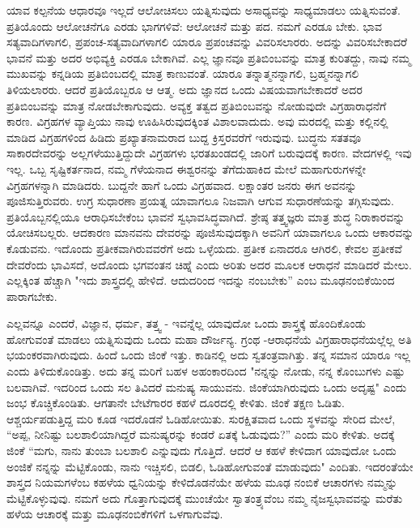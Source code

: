 ಯಾವ ಕಲ್ಪನೆಯ ಆಧಾರವೂ ಇಲ್ಲದೆ ಆಲೋಚಿಸಲು ಯತ್ನಿಸುವುದು ಅಸಾಧ್ಯವನ್ನು ಸಾಧ್ಯಮಾಡಲು ಯತ್ನಿಸುವಂತೆ. ಪ್ರತಿಯೊಂದು ಆಲೋಚನೆಗೂ ಎರಡು ಭಾಗಗಳಿವೆ: ಆಲೋಚನೆ ಮತ್ತು ಪದ. ನಮಗೆ ಎರಡೂ ಬೇಕು. ಭಾವ ಸತ್ಯವಾದಿಗಳಾಗಲಿ, ಪ್ರಪಂಚ-ಸತ್ಯವಾದಿಗಳಾಗಲಿ ಯಾರೂ ಪ್ರಪಂಚವನ್ನು ವಿವರಿಸಲಾರರು. ಅದನ್ನು ವಿವರಿಸಬೇಕಾದರೆ ಭಾವನೆ ಮತ್ತು ಅದರ ಅಭಿವ್ಯಕ್ತಿ ಎರಡೂ ಬೇಕಾಗಿವೆ. ಎಲ್ಲ ಜ್ಞಾನವೂ ಪ್ರತಿಬಿಂಬವನ್ನು ಮಾತ್ರ ಕುರಿತದ್ದು, ನಾವು ನಮ್ಮ ಮುಖವನ್ನು ಕನ್ನಡಿಯ ಪ್ರತಿಬಿಂಬದಲ್ಲಿ ಮಾತ್ರ ಕಾಣುವಂತೆ. ಯಾರೂ ತನ್ನಾತ್ಮನನ್ನಾಗಲಿ, ಬ್ರಹ್ಮನನ್ನಾಗಲಿ ತಿಳಿಯಲಾರರು. ಆದರೆ ಪ್ರತಿಯೊಬ್ಬರೂ ಆ ಆತ್ಮ. ಅದು ಜ್ಞಾನದ ಒಂದು ವಿಷಯವಾಗಬೇಕಾದರೆ ಅದರ ಪ್ರತಿಬಿಂಬವನ್ನು ಮಾತ್ರ ನೋಡಬೇಕಾಗುವುದು. ಅವ್ಯಕ್ತ ತತ್ವದ ಪ್ರತಿಬಿಂಬವನ್ನು ನೋಡುವುದೇ ವಿಗ್ರಹಾರಾಧನೆಗೆ ಕಾರಣ. ವಿಗ್ರಹಗಳ ವ್ಯಾಪ್ತಿಯು ನಾವು ಊಹಿಸಿರುವುದಕ್ಕಿಂತ ವಿಶಾಲವಾದುದು. ಅವು ಮರದಲ್ಲಿ ಮತ್ತು ಕಲ್ಲಿನಲ್ಲಿ ಮಾಡಿದ ವಿಗ್ರಹಗಳಿಂದ ಹಿಡಿದು ಪ್ರಖ್ಯಾತನಾಮರಾದ ಬುದ್ದ ಕ್ರಿಸ್ತರವರೆಗೆ ಇರುವುವು. ಬುದ್ಧನು ಸತತವೂ ಸಾಕಾರದೇವರನ್ನು ಅಲ್ಲಗಳೆಯುತ್ತಿದ್ದುದೇ ವಿಗ್ರಹಗಳು ಭರತಖಂಡದಲ್ಲಿ ಜಾರಿಗೆ ಬರುವುದಕ್ಕೆ ಕಾರಣ. ವೇದಗಳಲ್ಲಿ ಇವು ಇಲ್ಲ. ಒಬ್ಬ ಸೃಷ್ಟಿಕರ್ತನಾದ, ನಮ್ಮ ಗೆಳೆಯನಾದ ಈಶ್ವರನನ್ನು ತೆಗೆದುಹಾಕಿದ ಮೇಲೆ ಮಹಾಗುರುಗಳನ್ನೇ ವಿಗ್ರಹಗಳನ್ನಾಗಿ ಮಾಡಿದರು. ಬುದ್ದನೇ ಹಾಗೆ ಒಂದು ವಿಗ್ರಹವಾದ. ಲಕ್ಷಾಂತರ ಜನರು ಈಗ ಅವನನ್ನು ಪೂಜಿಸುತ್ತಿರುವರು. ಉಗ್ರ ಸುಧಾರಣಾ ಪ್ರಯತ್ನ ಯಾವಾಗಲೂ ನಿಜವಾಗಿ ಆಗುವ ಸುಧಾರಣೆಯನ್ನು ತಗ್ಗಿಸುವುದು. ಪ್ರತಿಯೊಬ್ಬನಲ್ಲಿಯೂ ಆರಾಧಿಸಬೇಕೆಂಬ ಭಾವನೆ ಸ್ವಭಾವಸಿದ್ಧವಾಗಿದೆ. ಶ್ರೇಷ್ಠ ತತ್ತ್ವಜ್ಞರು ಮಾತ್ರ ಶುದ್ಧ ನಿರಾಕಾರವನ್ನು ಯೋಚಿಸಬಲ್ಲರು. ಆದಕಾರಣ ಮಾನವನು ದೇವರನ್ನು ಪೂಜಿಸುವುದಕ್ಕಾಗಿ ಅವನಿಗೆ ಯಾವಾಗಲೂ ಒಂದು ಆಕಾರವನ್ನು ಕೊಡುವನು. ಇದೊಂದು ಪ್ರತೀಕವಾಗಿರುವವರೆಗೆ ಅದು ಒಳ್ಳೆಯದು. ಪ್ರತೀಕ ಏನಾದರೂ ಆಗಿರಲಿ, ಕೇವಲ ಪ್ರತೀಕವೆ ದೇವರೆಂದು ಭಾವಿಸದೆ, ಅದೊಂದು ಭಗವಂತನ ಚಿಹ್ನೆ ಎಂದು ಅರಿತು ಅದರ ಮೂಲಕ ಆರಾಧನೆ ಮಾಡಿದರೆ ಮೇಲು. ಎಲ್ಲಕ್ಕಿಂತ ಹೆಚ್ಚಾಗಿ "ಇದು ಶಾಸ್ತ್ರದಲ್ಲಿ ಹೇಳಿದೆ. ಆದುದರಿಂದ ಇದನ್ನು ನಂಬಬೇಕು'' ಎಂಬ ಮೂಢನಂಬಿಕೆಯಿಂದ ಪಾರಾಗಬೇಕು.

ಎಲ್ಲವನ್ನೂ ಎಂದರೆ, ವಿಜ್ಞಾನ, ಧರ್ಮ, ತತ್ತ್ವ - ಇವನ್ನೆಲ್ಲ ಯಾವುದೋ ಒಂದು ಶಾಸ್ತ್ರಕ್ಕೆ ಹೊಂದಿಕೊಂಡು ಹೋಗುವಂತೆ ಮಾಡಲು ಯತ್ನಿಸುವುದು ಒಂದು ಮಹಾ ದೌರ್ಜನ್ಯ. ಗ್ರಂಥ -ಆರಾಧನೆಯೆ ವಿಗ್ರಹಾರಾಧನೆಯಲ್ಲೆಲ್ಲ ಅತಿ ಭಯಂಕರವಾಗಿರುವುದು. ಹಿಂದೆ ಒಂದು ಜಿಂಕೆ ಇತ್ತು. ಕಾಡಿನಲ್ಲಿ ಅದು ಸ್ವತಂತ್ರವಾಗಿತ್ತು. ತನ್ನ ಸಮಾನ ಯಾರೂ ಇಲ್ಲ ಎಂದು ತಿಳಿದುಕೊಂಡಿತ್ತು. ಅದು ತನ್ನ ಮರಿಗೆ ಬಹಳ ಅಹಂಕಾರದಿಂದ "ನನ್ನನ್ನು ನೋಡು, ನನ್ನ ಕೊಂಬುಗಳು ಎಷ್ಟು ಬಲವಾಗಿವೆ. ಇದರಿಂದ ಒಂದು ಸಲ ತಿವಿದರೆ ಮನುಷ್ಯ ಸಾಯುವನು. ಜಿಂಕೆಯಾಗಿರುವುದು ಒಂದು ಅದೃಷ್ಟ" ಎಂದು ಜಂಭ ಕೊಚ್ಚಿಕೊಂಡಿತು. ಆಗತಾನೇ ಬೇಟೆಗಾರರ ಕಹಳೆ ದೂರದಲ್ಲಿ ಕೇಳಿತು. ಜಿಂಕೆ ತಕ್ಷಣ ಓಡಿತು. ಆಶ್ಚರ್ಯಪಡುತ್ತಿದ್ದ ಮರಿ ಕೂಡ ಇದರೊಡನೆ ಓಡಿಹೋಯಿತು. ಸುರಕ್ಷಿತವಾದ ಒಂದು ಸ್ಥಳವನ್ನು ಸೇರಿದ ಮೇಲೆ, “ಅಪ್ಪ, ನೀನಿಷ್ಟು ಬಲಶಾಲಿಯಾಗಿದ್ದರೆ ಮನುಷ್ಯರನ್ನು ಕಂಡರೆ ಏತಕ್ಕೆ ಓಡುವುದು?'' ಎಂದು ಮರಿ ಕೇಳಿತು. ಅದಕ್ಕೆ ಜಿಂಕೆ “ಮಗು, ನಾನು ತುಂಬಾ ಬಲಶಾಲಿ ಎನ್ನುವುದು ಗೊತ್ತಿದೆ. ಆದರೆ ಆ ಕಹಳೆ ಕೇಳಿದಾಗ ಯಾವುದೋ ಒಂದು ಅಂಜಿಕೆ ನನ್ನನ್ನು ಮೆಟ್ಟಿಕೊಂಡು, ನಾನು ಇಚ್ಚಿಸಲಿ, ಬಿಡಲಿ, ಓಡಿಹೋಗುವಂತೆ ಮಾಡುವುದು" ಎಂದಿತು. ಇದರಂತೆಯೇ ಶಾಸ್ತ್ರದ ನಿಯಮಗಳೆಂಬ ಕಹಳೆಯ ಧ್ವನಿಯನ್ನು ಕೇಳಿದೊಡನೆಯೇ ಹಳೆಯ ಮೂಢ ನಂಬಿಕೆ ಆಚಾರಗಳು ನಮ್ಮನ್ನು ಮೆಟ್ಟಿಕೊಳ್ಳುವುವು. ನಮಗೆ ಅದು ಗೊತ್ತಾಗುವುದಕ್ಕೆ ಮುಂಚೆಯೇ ಸ್ವಾತಂತ್ರ್ಯವೆಂಬ ನಮ್ಮ ನೈಜಸ್ವಭಾವವನ್ನು ಮರೆತು ಹಳೆಯ ಆಚಾರಕ್ಕೆ ಮತ್ತು ಮೂಢನಂಬಿಕೆಗಳಿಗೆ ಒಳಗಾಗುವೆವು.

